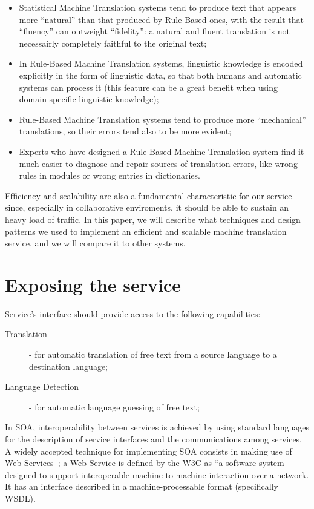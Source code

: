 \documentclass[11pt]{article}
\begin{document}
\begin{itemize}
 \item Statistical Machine Translation systems tend to produce text that appears more ``natural'' than that produced by Rule-Based ones, with the result that ``fluency'' can outweight ``fidelity'': a natural and fluent translation is not necessairly completely faithful to the original text;
 \item In Rule-Based Machine Translation systems, linguistic knowledge is encoded explicitly in the form of linguistic data, so that both humans and automatic systems can process it (this feature can be a great benefit when using domain-specific linguistic knowledge);
 \item Rule-Based Machine Translation systems tend to produce more ``mechanical'' translations, so their errors tend also to be more evident;
 \item Experts who have designed a Rule-Based Machine Translation system find it much easier to diagnose and repair sources of translation errors, like wrong rules in modules or wrong entries in dictionaries.
\end{itemize}

Efficiency and scalability are also a fundamental characteristic for our service since, especially in collaborative enviroments, it should be able to sustain an heavy load of traffic. In this paper, we will describe what techniques and design patterns we used to implement an efficient and scalable machine translation service, and we will compare it to other systems.


\section{Exposing the service}

Service's interface should provide access to the following capabilities:

\begin{description}
  \item[Translation] - for automatic translation of free text from a source language to a destination language;
  \item[Language Detection] - for automatic language guessing of free text;
\end{description}

In SOA, interoperability between services is achieved by using standard languages for the description of service interfaces and the communications among services. A widely accepted technique for implementing SOA consists in making use of Web Services~\citep{soa}; a Web Service is defined by the W3C as ``a software system designed to support interoperable machine-to-machine interaction over a network. It has an interface described in a machine-processable format (specifically WSDL).
\end{document}
